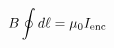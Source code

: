 \documentclass[preview]{standalone}
\begin{document}
\begin{align*}
\special{dvisvgm:raw <g id='unique000'>}B\oint d\ell=\mu_0 I_{\mathrm{enc}}\special{dvisvgm:raw </g>}
\end{align*}
\end{document}
